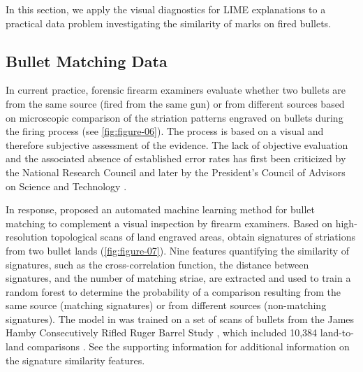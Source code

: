 \documentclass[AMS,STIX2COL]{WileyNJD-v2}\usepackage[]{graphicx}\usepackage[]{color}
\begin{document}
In this section, we apply the visual diagnostics for LIME explanations to a practical data problem investigating the similarity of marks on fired bullets.

\subsection{Bullet Matching Data}







In current practice, forensic firearm examiners evaluate whether two bullets are from the same source (fired from the same gun) or from different sources based on microscopic comparison of the striation patterns engraved on bullets during the firing process (see \autoref{fig:figure-06}). The process is based on a visual and therefore subjective assessment of the evidence. The lack of objective evaluation and the associated absence of established error rates has first been criticized by the National Research Council \cite{nrc:2009} and later by the President's Council of Advisors on Science and Technology \cite{pcast:2016}.

In response, \citet{hare:2017} proposed an automated machine learning method for bullet matching to complement a visual inspection by firearm examiners. Based on high-resolution topological scans of land engraved areas, \citet{hare:2017} obtain signatures of striations from two bullet lands (\autoref{fig:figure-07}). Nine features quantifying the similarity of signatures, such as the cross-correlation function, the distance between signatures, and the number of matching striae, are extracted and used to train a random forest to determine the probability of a comparison resulting from the same source (matching signatures) or from different sources (non-matching signatures). The model in \citet{hare:2017} was trained on a set of scans of bullets from the James Hamby Consecutively Rifled Ruger Barrel Study \citep{hamby:2009}, which included 10,384 land-to-land comparisons \citep{hare:2017}. See the supporting information for additional information on the signature similarity features.
\end{document}

